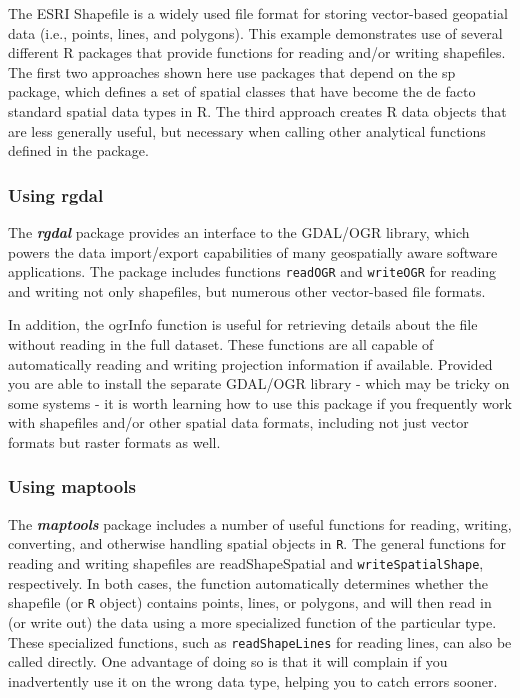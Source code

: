 \documentclass[12pt]{article}
\begin{document}

The ESRI Shapefile is a widely used file format for storing vector-based geopatial data (i.e., points, lines, and polygons). This example demonstrates use of several different R packages that provide functions for reading and/or writing shapefiles. The first two approaches shown here use packages that depend on the sp package, which defines a set of spatial classes that have become the de facto standard spatial data types in R. The third approach creates R data objects that are less generally useful, but necessary when calling other analytical functions defined in the package.


\subsubsection{Using rgdal}
The \textit{\textbf{rgdal}} package provides an interface to the GDAL/OGR library, which powers the data import/export capabilities of many geospatially aware software applications. The package includes functions \texttt{readOGR} and \texttt{writeOGR} for reading and writing not only shapefiles, but numerous other vector-based file formats. 

In addition, the ogrInfo function is useful for retrieving details about the file without reading in the full dataset. These functions are all capable of automatically reading and writing projection information if available. Provided you are able to install the separate GDAL/OGR library - which may be tricky on some systems - it is worth learning how to use this package if you frequently work with shapefiles and/or other spatial data formats, including not just vector formats but raster formats as well.

\subsubsection{Using maptools}
The \textit{\textbf{maptools}} package includes a number of useful functions for reading, writing, converting, and otherwise handling spatial objects in \texttt{R}. The general functions for reading and writing shapefiles are readShapeSpatial and \texttt{writeSpatialShape}, respectively. In both cases, the function automatically determines whether the shapefile (or \texttt{R} object) contains points, lines, or polygons, and will then read in (or write out) the data using a more specialized function of the particular type. These specialized functions, such as \texttt{readShapeLines} for reading lines, can also be called directly. One advantage of doing so is that it will complain if you inadvertently use it on the wrong data type, helping you to catch errors sooner. 
\end{document}
